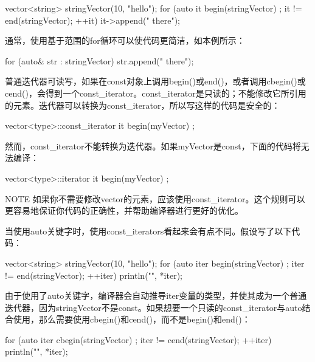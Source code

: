 \begin{cpp}
vector<string> stringVector(10, "hello");
for (auto it { begin(stringVector) }; it != end(stringVector); ++it) {
    it->append(" there");
}
\end{cpp}

通常，使用基于范围的for循环可以使代码更简洁，如本例所示：

\begin{cpp}
for (auto& str : stringVector) {
    str.append(" there");
}
\end{cpp}


普通迭代器可读写，如果在const对象上调用begin()或end()，或者调用cbegin()或cend()，会得到一个const\_iterator。const\_iterator是只读的；不能修改它所引用的元素。迭代器可以转换为const\_iterator，所以写这样的代码是安全的：

\begin{cpp}
vector<type>::const_iterator it { begin(myVector) };
\end{cpp}

然而，const\_iterator不能转换为迭代器。如果myVector是const，下面的代码将无法编译：

\begin{cpp}
vector<type>::iterator it { begin(myVector) };
\end{cpp}

\begin{myNotic}{NOTE}
如果你不需要修改vector的元素，应该使用const\_iterator。这个规则可以更容易地保证你代码的正确性，并帮助编译器进行更好的优化。
\end{myNotic}

当使用auto关键字时，使用const\_iterators看起来会有点不同。假设写了以下代码：

\begin{cpp}
vector<string> stringVector(10, "hello");
for (auto iter { begin(stringVector) }; iter != end(stringVector); ++iter) {
    println("{}", *iter);
}
\end{cpp}

由于使用了auto关键字，编译器会自动推导iter变量的类型，并使其成为一个普通迭代器，因为stringVector不是const。如果想要一个只读的const\_iterator与auto结合使用，那么需要使用cbegin()和cend()，而不是begin()和end()：

\begin{cpp}
for (auto iter { cbegin(stringVector) }; iter != cend(stringVector); ++iter) {
    println("{}", *iter);
}
\end{cpp}

